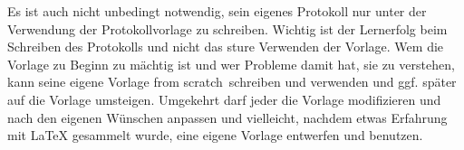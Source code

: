 Es ist auch nicht unbedingt notwendig, sein eigenes Protokoll nur unter der 
Verwendung der Protokollvorlage zu schreiben. Wichtig ist der Lernerfolg beim 
Schreiben des Protokolls und nicht das sture Verwenden der Vorlage. Wem die 
Vorlage zu Beginn zu mächtig ist und wer Probleme damit hat, sie zu verstehen, 
kann seine eigene Vorlage \glqq from scratch\grqq\ schreiben und verwenden und 
ggf. später auf die Vorlage umsteigen. Umgekehrt darf jeder die Vorlage 
modifizieren und nach den eigenen Wünschen anpassen und vielleicht, nachdem 
etwas Erfahrung mit LaTeX gesammelt wurde, eine eigene Vorlage entwerfen und 
benutzen.